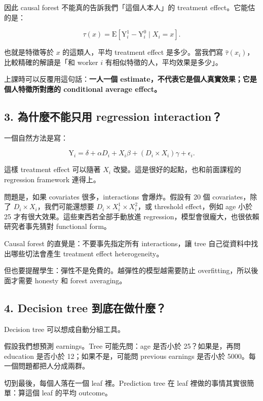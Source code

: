 \documentclass[
  chinese,
  11pt,
]{article}
\begin{document}
因此 causal forest 不能真的告訴我們「這個人本人」的 treatment
effect。它能估的是：

\[
\tau(x)=
\mathrm{E}\left[\mathrm{Y}^{1}_{i}-\mathrm{Y}^{0}_{i}\mid X_i=x\right].
\]

也就是特徵等於 \(x\) 的這類人，平均 treatment effect 是多少。當我們寫
\(\hat{\tau}(x_i)\)，比較精確的解讀是「和 worker \(i\)
有相似特徵的人，平均效果是多少」。

上課時可以反覆用這句話：\textbf{一人一個
estimate，不代表它是個人真實效果；它是個人特徵所對應的 conditional
average effect。}

\subsection{3. 為什麼不能只用 regression
interaction？}\label{ux70baux4ec0ux9ebcux4e0dux80fdux53eaux7528-regression-interaction}

一個自然方法是寫：

\[
\mathrm{Y}_i
=
\delta+\alpha D_i+X_i\beta+(D_i\times X_i)\gamma+\epsilon_i.
\]

這樣 treatment effect 可以隨著 \(X_i\)
改變。這是很好的起點，也和前面課程的 regression framework 連得上。

問題是，如果 covariates 很多，interactions 會爆炸。假設有 20 個
covariates，除了 \(D_i\times X_i\)，我們可能還想要
\(D_i\times X_i^1\times X_i^2\)，或 threshold effect，例如 age 小於 25
才有很大效果。這些東西若全部手動放進
regression，模型會很龐大，也很依賴研究者事先猜對 functional form。

Causal forest 的直覺是：不要事先指定所有 interactions，讓 tree
自己從資料中找出哪些切法會產生 treatment effect heterogeneity。

但也要提醒學生：彈性不是免費的。越彈性的模型越需要防止
overfitting，所以後面才需要 honesty 和 forest averaging。

\subsection{4. Decision tree
到底在做什麼？}\label{decision-tree-ux5230ux5e95ux5728ux505aux4ec0ux9ebc}

Decision tree 可以想成自動分組工具。

假設我們想預測 earnings。Tree 可能先問：age 是否小於 25？如果是，再問
education 是否小於 12；如果不是，可能問 previous earnings 是否小於
5000。每一個問題都把人分成兩群。

切到最後，每個人落在一個 leaf 裡。Prediction tree 在 leaf
裡做的事情其實很簡單：算這個 leaf 的平均 outcome。
\end{document}
